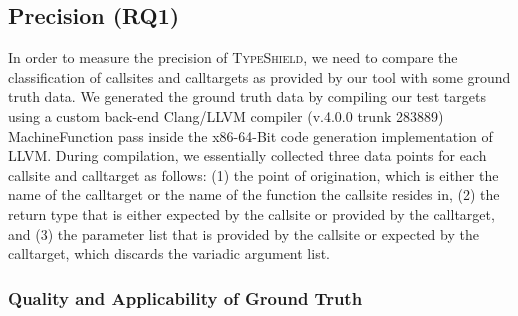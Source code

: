 \subsection{Precision (RQ1)}
\label{section:typeshieldprecision}

In order to measure the precision of \textsc{TypeShield}, we need to compare the classification of callsites and calltargets as provided by our tool with 
some ground truth data. We generated the ground truth data by compiling our test targets using a 
custom back-end Clang/LLVM compiler (v.4.0.0 trunk 283889) MachineFunction pass inside the x86-64-Bit code generation implementation of LLVM. 
During compilation, we essentially collected three data points for each callsite and calltarget as follows:
(1) the point of origination, which is either the name of the calltarget or the name of the function the callsite resides in, 
(2) the return type that is either expected by the callsite or provided by the calltarget, and 
(3) the parameter list that is provided by the callsite or expected by the calltarget, which discards the variadic argument list.

\subsubsection{Quality and Applicability of Ground Truth}
\label{subsection:typeshieldprecision}

\texttt{}

